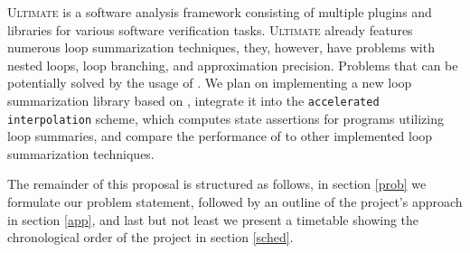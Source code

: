 \textsc{Ultimate}\cite{Zitat02} is a software analysis framework consisting of multiple plugins and libraries for various software verification tasks. \textsc{Ultimate} already features numerous loop summarization techniques, they, however, have problems with nested loops, loop branching, and approximation precision. Problems that can be potentially solved by the usage of \qvasrs. We plan on implementing a new loop summarization library based on \qvasrs, integrate it into the \texttt{accelerated interpolation} scheme, which computes state assertions for programs utilizing loop summaries, and compare the performance of \qvasrs to other implemented loop summarization techniques. \par
The remainder of this proposal is structured as follows, in section \ref{prob} we formulate our problem statement, followed by an outline of the project's approach in section \ref{app}, and last but not least we present a timetable showing the chronological order of the project in section \ref{sched}.
